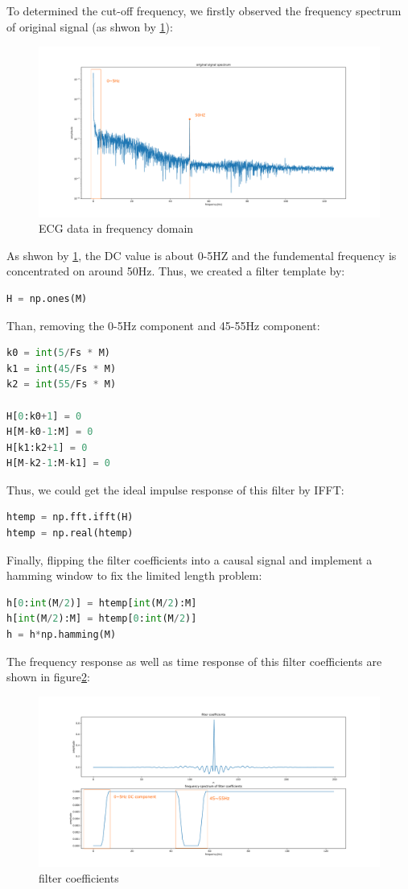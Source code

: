 \documentclass[a4paper,12pt]{article}
\begin{document}
\subsection{}
To determined the cut-off frequency, we firstly observed the frequency spectrum of original signal (as shwon by \ref{fig_ecgFrequency}): 
\begin{figure}[H]   
	\centering 
	\includegraphics[width=12cm]{../Figures/ecgDataFrequency_refine.pdf} 
	\caption{ECG data in frequency domain}   
	\label{fig_ecgFrequency}
\end{figure}
As shwon by \ref{fig_ecgFrequency}, the DC value is about 0-5HZ and the fundemental frequency  is concentrated on around 50Hz. Thus, we created a filter template by:
\begin{lstlisting}[language=Python]
H = np.ones(M)
\end{lstlisting}
Than,  removing the 0-5Hz component and 45-55Hz component:
\begin{lstlisting}[language=Python]
k0 = int(5/Fs * M)
k1 = int(45/Fs * M)
k2 = int(55/Fs * M)

H[0:k0+1] = 0
H[M-k0-1:M] = 0
H[k1:k2+1] = 0
H[M-k2-1:M-k1] = 0
\end{lstlisting}
Thus, we could get the ideal impulse response of this filter by IFFT:
\begin{lstlisting}[language=Python]
htemp = np.fft.ifft(H)
htemp = np.real(htemp)
\end{lstlisting}
Finally, flipping the filter coefficients into a causal signal and implement a hamming window to fix the limited length problem:
\begin{lstlisting}[language=Python]
h[0:int(M/2)] = htemp[int(M/2):M]
h[int(M/2):M] = htemp[0:int(M/2)]
h = h*np.hamming(M)
\end{lstlisting}
The frequency response as well as time response of this filter coefficients are shown in figure\ref{fig_H}:
\begin{figure}[H]   
	\centering 
	\includegraphics[width=12cm]{../Figures/filterCoefficients_refine.pdf} 
	\caption{filter coefficients}   
	\label{fig_H}
\end{figure}
\end{document}
